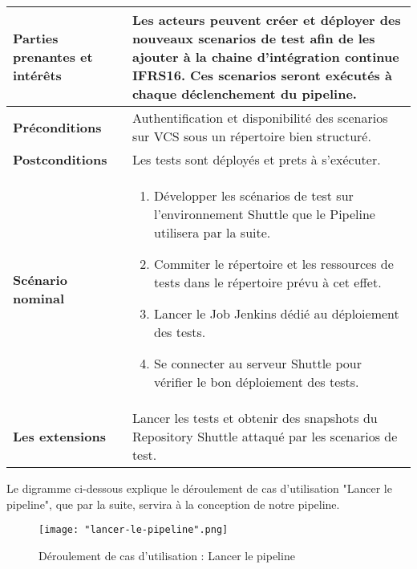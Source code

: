 \begin{spacing}{1.2}
\begin{table}[ht]
\begin{tabularx}{\textwidth}{|p{3.3cm}|X|}
          \\
          \hline
          {\textbf{Parties prenantes et intérêts}}
          & 
          Les acteurs peuvent créer et déployer des nouveaux scenarios de test afin de les ajouter à la chaine d'intégration continue IFRS16. Ces scenarios seront exécutés à chaque déclenchement du pipeline. 
          \\
          \hline
          {\textbf{Préconditions}}
          & 
          Authentification et disponibilité des scenarios sur VCS sous un répertoire bien structuré.
          \\
          \hline
          {\textbf{Postconditions}}
          & 
          Les tests sont déployés et prets à s'exécuter.
          \\
          \hline
          {\textbf{Scénario nominal}}
          & 
          \vspace{-4mm}
          \begin{enumerate}
          \setlength\itemsep{0em}
              \item Développer les scénarios de test sur l'environnement Shuttle que le Pipeline utilisera par la suite.
              \item Commiter le répertoire et les ressources de tests dans le répertoire prévu à cet effet.
              \item Lancer le Job Jenkins dédié au déploiement des tests.
              \item Se connecter au serveur Shuttle pour vérifier le bon déploiement des tests.
          \end{enumerate}
          \\
          \hline
          {\textbf{Les extensions}}
          &  
          Lancer les tests et obtenir des snapshots du Repository Shuttle attaqué par les scenarios de test.
          \\
          \hline
        \end{tabularx}
	\label{tab:exple}
\end{table}
\FloatBarrier
Le digramme ci-dessous explique le déroulement de cas d'utilisation "Lancer le pipeline", que par la suite, servira à la conception de notre pipeline.
\begin{figure}[!ht]\centering
\texttt{[image: "lancer-le-pipeline".png]}
\caption{Déroulement de cas d'utilisation : Lancer le pipeline}
\label{fig:fig3}
\end{figure}
\FloatBarrier

\end{spacing}
